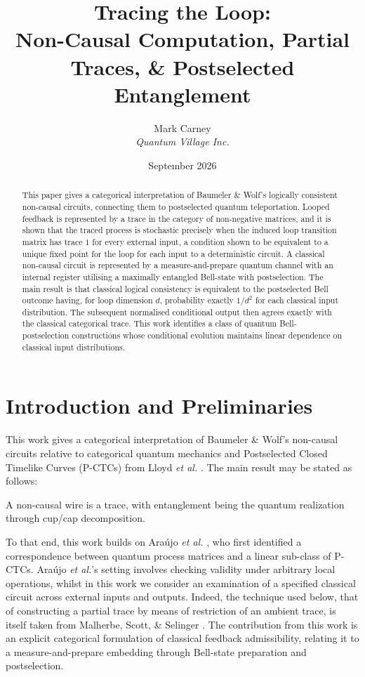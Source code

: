\documentclass[10pt, a4paper]{article}
\title{Tracing the Loop: \\ \large Non-Causal Computation, Partial Traces, \& Postselected Entanglement}
\author{Mark Carney \\ \emph{Quantum Village Inc.}}
\date{September 2026}
\begin{document}
\maketitle

\begin{abstract}
    This paper gives a categorical interpretation of Baumeler \& Wolf's logically consistent non-causal circuits, connecting them to postselected quantum teleportation. Looped feedback is represented by a trace in the category of non-negative matrices, and it is shown that the traced process is stochastic precisely when the induced loop transition matrix has trace $1$ for every external input, a condition shown to be equivalent to a unique fixed point for the loop for each input to a deterministic circuit. A classical non-causal circuit is represented by a measure-and-prepare quantum channel with an internal register utilising a maximally entangled Bell-state with postselection. The main result is that classical logical consistency is equivalent to the postselected Bell outcome having, for loop dimension $d$, probability exactly $1/d^2$ for each classical input distribution. The subsequent normalised conditional output then agrees exactly with the classical categorical trace. This work identifies a class of quantum Bell-postselection constructions whose conditional evolution maintains linear dependence on classical input distributions.
\end{abstract}


\section{Introduction and Preliminaries}

This work gives a categorical interpretation of Baumeler \& Wolf's non-causal circuits \cite{BaumelerWolf2017} relative to categorical quantum mechanics and Postselected Closed Timelike Curves (P-CTCs) from Lloyd \emph{et al.} \cite{Lloyd2011-zc}. The main result may be stated as follows:

\begin{center}
\begin{framed}
    \noindent A non-causal wire is a trace, with entanglement being the quantum realization through cup/cap decomposition.
\end{framed}
\end{center}

To that end, this work builds on Ara\'ujo \emph{et al.} \cite{Arajo2017}, who first identified a correspondence between quantum process matrices and a linear sub-class of P-CTCs. Ara\'ujo \emph{et al.}'s setting involves checking validity under arbitrary local operations, whilst in this work we consider an examination of a specified classical circuit across external inputs and outputs. Indeed, the technique used below, that of constructing a partial trace by means of restriction of an ambient trace, is itself taken from Malherbe, Scott, \& Selinger \cite{Malherbe2012}. The contribution from this work is an explicit categorical formulation of classical feedback admissibility, relating it to a measure-and-prepare embedding through Bell-state preparation and postselection.
\end{document}
